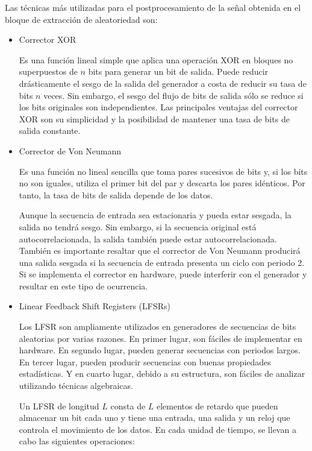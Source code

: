 	            Las técnicas más utilizadas para el postprocesamiento de la señal obtenida en el bloque de extracción de aleatoriedad son: 
	
                \begin{itemize}
                    \item Corrector XOR 
                    
                        Es una función lineal simple que aplica una operación XOR en bloques no superpuestos de $n$ bits para generar un bit de salida. Puede reducir drásticamente el sesgo de la salida del generador a costa de reducir su tasa de bits $n$ veces. Sin embargo, el sesgo del flujo de bits de salida sólo se reduce si los bits originales son independientes. Las principales ventajas del corrector XOR son su simplicidad y la posibilidad de mantener una tasa de bits de salida constante.

                    \item Corrector de Von Neumann
                    
                        Es una función no lineal sencilla que toma pares sucesivos de bits y, si los bits no son iguales, utiliza el primer bit del par y descarta los pares idénticos. Por tanto, la tasa de bits de salida depende de los datos.

                        Aunque la secuencia de entrada sea estacionaria y pueda estar sesgada, la salida no tendrá sesgo. Sin embargo, si la secuencia original está autocorrelacionada, la salida también puede estar autocorrelacionada. También es importante resaltar que el corrector de Von Neumann producirá una salida sesgada si la secuencia de entrada presenta un ciclo con periodo 2. Si se implementa el corrector en hardware, puede interferir con el generador y resultar en este tipo de ocurrencia.

                    \item Linear Feedback Shift Registers (LFSRs)
                    
                        Los LFSR son ampliamente utilizados en generadores de secuencias de bits aleatorias por varias razones. En primer lugar, son fáciles de implementar en hardware. En segundo lugar, pueden generar secuencias con periodos largos. En tercer lugar, pueden producir secuencias con buenas propiedades estadísticas. Y en cuarto lugar, debido a su estructura, son fáciles de analizar utilizando técnicas algebraicas.

                        Un LFSR de longitud $L$ consta de $L$ elementos de retardo que pueden almacenar un bit cada uno y tiene una entrada, una salida y un reloj que controla el movimiento de los datos. En cada unidad de tiempo, se llevan a cabo las siguientes operaciones:


\end{itemize}
